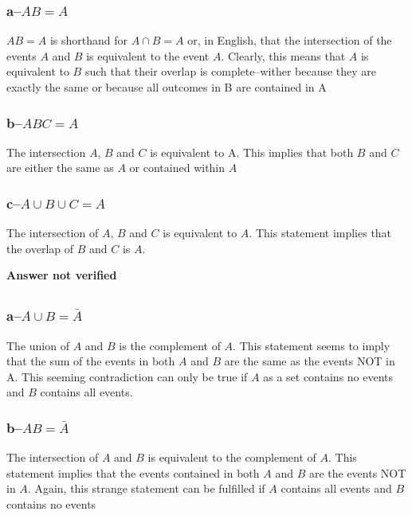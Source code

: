 \subsubsection{a--$AB=A$}
$AB=A$ is shorthand for $A\cap B=A$ or, in English, that the intersection of the events $A$ and $B$ is equivalent to the event $A$.  Clearly, this means that $A$ is equivalent to $B$ such that their overlap is complete--wither because they are exactly the same or because all outcomes in B are contained in A
\subsubsection{b--$ABC=A$}

The intersection $A$, $B$ and $C$ is equivalent to A. This implies that both $B$ and $C$ are either the same as $A$ or contained within $A$

\subsubsection{c--$A\cup B\cup C=A$}

The intersection of $A$, $B$ and $C$ is equivalent to $A$.  This statement implies that the overlap of $B$ and $C$ is $A$.  

\textbf{Answer not verified}


\subsection{}
\subsubsection{a--$A \cup B = \bar{A}$}

The union of $A$ and $B$ is the complement of $A$.  This statement seems to imply that the sum of the events in both $A$ and $B$ are the same as the events NOT in A.  This seeming contradiction can only be true if $A$ as a set contains no events and $B$ contains all events.


\subsubsection{b--$AB=\bar{A}$}

The intersection of $A$ and $B$ is equivalent to the complement of $A$.  This statement implies that the events contained in both $A$ and $B$ are the events NOT in $A$.  Again, this strange statement can be fulfilled if $A$ contains all events and $B$ contains no events 

